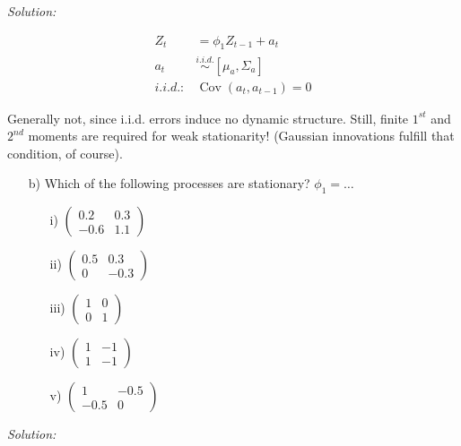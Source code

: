 \documentclass[12pt,a4paper]{article}
\newcommand{\Cov}{\operatorname{Cov}}
\begin{document}
\emph{Solution:}

\begin{align*}
  Z_t & = \phi_1 Z_{t-1} + a_t\\
  a_t & \overset{i.i.d.}{\sim} \left[ \mu_a , \Sigma_a \right]\\
  i.i.d.: & \Cov (a_t , a_{t-1}) = 0
\end{align*}

Generally not, since i.i.d. errors induce no dynamic structure. Still,
finite \(1^{st}\) and \(2^{nd}\) moments are required for weak
stationarity! (Gaussian innovations fulfill that condition, of course).

\begin{itemize}
 \item[b)] Which of the following processes are stationary? $\phi_{1} = \dots $ \\
\begin{itemize} 
    \item[i)] $ \begin{pmatrix}
    0.2 & 0.3 \\ 
    -0.6 & 1.1
    \end{pmatrix} $
    \hspace{8em}
    \item[ii)] $ \begin{pmatrix}
    0.5 & 0.3 \\ 
    0 & -0.3
    \end{pmatrix} $
    \item[iii)] $ \begin{pmatrix}
    1 & 0 \\ 
    0 & 1
    \end{pmatrix} $
    \hspace{8em}
    \item[iv)] $ \begin{pmatrix}
    1 & -1 \\ 
    1 & -1
    \end{pmatrix} $
    \hspace{8em}
    \item[v)] $ \begin{pmatrix}
    1 & -0.5 \\ 
    -0.5 & 0
    \end{pmatrix} $
\end{itemize}
\end{itemize}

\emph{Solution:}
\end{document}
